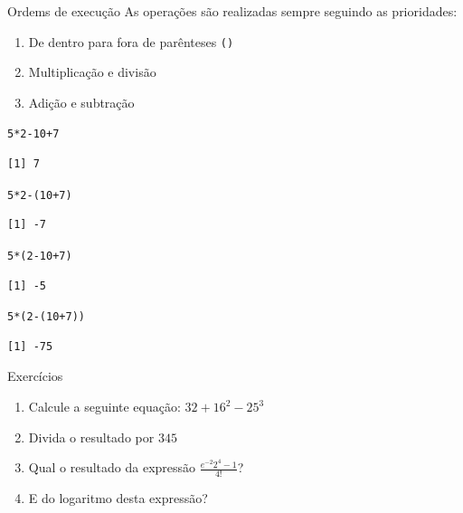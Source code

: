 \documentclass[10pt,handout]{beamer}\usepackage[]{graphicx}\usepackage[]{color}
\makeatletter
\newcommand{\hlnum}[1]{\textcolor[rgb]{0.686,0.059,0.569}{#1}}%
\newcommand{\hlopt}[1]{\textcolor[rgb]{0,0,0}{#1}}%
\newcommand{\hlstd}[1]{\textcolor[rgb]{0.345,0.345,0.345}{#1}}%
\newenvironment{kframe}{%
 \def\at@end@of@kframe{}%
 \ifinner\ifhmode%
  \def\at@end@of@kframe{\end{minipage}}%
  \begin{minipage}{\columnwidth}%
 \fi\fi%
 \def\FrameCommand##1{\hskip\@totalleftmargin \hskip-\fboxsep
 \colorbox{shadecolor}{##1}\hskip-\fboxsep
     \hskip-\linewidth \hskip-\@totalleftmargin \hskip\columnwidth}%
 \MakeFramed {\advance\hsize-\width
   \@totalleftmargin\z@ \linewidth\hsize
   \@setminipage}}%
 {\par\unskip\endMakeFramed%
 \at@end@of@kframe}
\newenvironment{knitrout}{}{} %
\makeatother
\begin{document}
\begin{frame}[fragile]{Ordems de execução}
As operações são realizadas sempre seguindo as prioridades:
\begin{enumerate}
\item De dentro para fora de parênteses \verb|()|
\item Multiplicação e divisão
\item Adição e subtração
\end{enumerate}
\begin{knitrout}\small
{}\color{fgcolor}\begin{kframe}
\begin{alltt}
\hlnum{5} \hlopt{*} \hlnum{2} \hlopt{-} \hlnum{10} \hlopt{+} \hlnum{7}
\end{alltt}
\begin{verbatim}
[1] 7
\end{verbatim}
\begin{alltt}
\hlnum{5} \hlopt{*} \hlnum{2} \hlopt{-} \hlstd{(}\hlnum{10} \hlopt{+} \hlnum{7}\hlstd{)}
\end{alltt}
\begin{verbatim}
[1] -7
\end{verbatim}
\begin{alltt}
\hlnum{5} \hlopt{*} \hlstd{(}\hlnum{2} \hlopt{-} \hlnum{10} \hlopt{+} \hlnum{7}\hlstd{)}
\end{alltt}
\begin{verbatim}
[1] -5
\end{verbatim}
\begin{alltt}
\hlnum{5} \hlopt{*} \hlstd{(}\hlnum{2} \hlopt{-} \hlstd{(}\hlnum{10} \hlopt{+} \hlnum{7}\hlstd{))}
\end{alltt}
\begin{verbatim}
[1] -75
\end{verbatim}
\end{kframe}
\end{knitrout}
\end{frame}

\begin{frame}[fragile]{Exercícios}
  \begin{enumerate}
  \item Calcule a seguinte equação: $32 + 16^2 - 25^3$
  \item Divida o resultado por $345$
  \item Qual o resultado da expressão $\frac{e^{-2}  2^{4} - 1}{4!}$?
  \item E do logaritmo desta expressão?
  \end{enumerate}
\end{frame}
\end{document}
